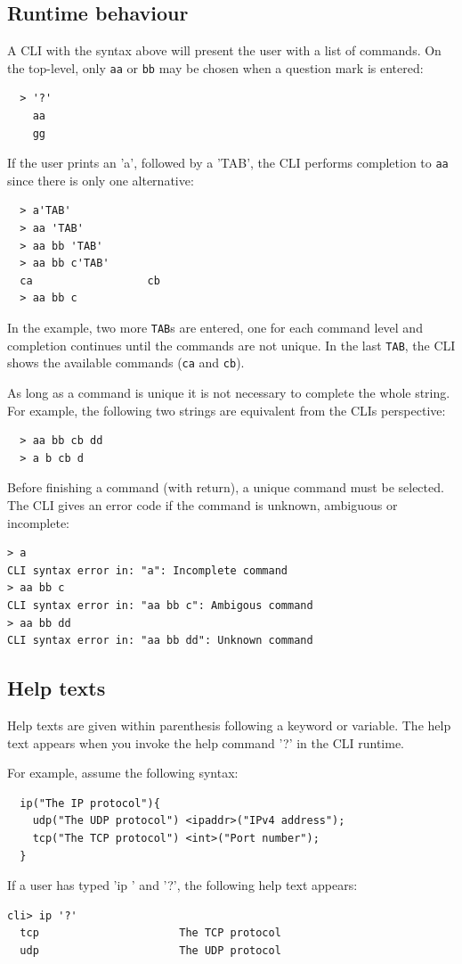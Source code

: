 \documentclass[a4paper, 10pt] {article}
\begin{document}
\subsection{Runtime behaviour}

A CLI with the syntax above will present the user with a list of
commands. On the top-level, only {\tt aa} or {\tt bb} may be chosen when a question mark is entered:
\begin{verbatim}
  > '?'
    aa
    gg
\end{verbatim}

If the user prints an 'a', followed by a 'TAB', the CLI performs
completion to {\tt aa} since there is only one alternative:
\begin{verbatim}
  > a'TAB'
  > aa 'TAB'
  > aa bb 'TAB'
  > aa bb c'TAB'
  ca                  cb
  > aa bb c
\end{verbatim}
In the example, two more {\tt TAB}s are entered, one for each command
level and completion continues until the commands are not unique. In
the last {\tt TAB}, the CLI shows the available commands ({\tt ca} and {\tt cb}).

As long as a command is unique it is not necessary to
complete the whole string. For example, the following two strings are
equivalent from the CLIs perspective:
\begin{verbatim}
  > aa bb cb dd
  > a b cb d
\end{verbatim}

Before finishing a command (with return), a unique
command must be selected. The CLI gives an error code if the command
is unknown, ambiguous or incomplete:
\begin{verbatim}
> a
CLI syntax error in: "a": Incomplete command
> aa bb c
CLI syntax error in: "aa bb c": Ambigous command
> aa bb dd
CLI syntax error in: "aa bb dd": Unknown command
\end{verbatim}

\subsection{Help texts}

Help texts are given within parenthesis following a keyword or
variable. The help text appears when you invoke the help command '?'
in the CLI runtime.

For example, assume the following syntax:
\begin{verbatim}
  ip("The IP protocol"){
    udp("The UDP protocol") <ipaddr>("IPv4 address");
    tcp("The TCP protocol") <int>("Port number");
  }
\end{verbatim}
If a user has typed 'ip ' and '?', the following help text appears:
\begin{verbatim}
cli> ip '?'
  tcp                      The TCP protocol
  udp                      The UDP protocol
\end{verbatim}
\end{document}
